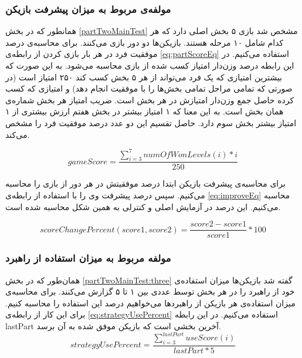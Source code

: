 \documentclass[twoside, a4paper,11pt]{book}
\numberwithin{equation}{chapter}
\numberwithin{table}{chapter}
\numberwithin{figure}{chapter}
\numberwithin{equation}{chapter}
\begin{document}
\subsubsection{مولفه‌ی مربوط به میزان پیشرفت بازیکن}

همانطور که در بخش \ref{partTwoMainTest} مشخص شد بازی ۵ بخش اصلی دارد که هر کدام شامل ۱۰ مرحله هستند. بازیکن‌ها دو دور بازی می‌کنند. برای محاسبه‌ی درصد موفقیت فرد در هر بار بازی کردن از رابطه‌ی \ref{eq:partScoreEq} استفاده می‌کنیم. در این رابطه درصد وزن‌دار امتیاز کسب شده از بازی محاسبه می‌شود. به این صورت که بیشترین امتیازی که یک فرد می‌تواند از هر ۵ بخش کسب کند ۲۵۰ امتیاز است (در صورتی که تمامی مراحل تمامی بخش‌ها را با موفقیت انجام دهد) و امتیازی که کسب کرده حاصل جمع وزن‌دار امتیازش در هر بخش است. ضریب امتیاز هر بخش شماره‌ی همان بخش است. به این معنا که ۱ امتیاز بیشتر در بخش هفتم ارزش بیشتری از ۱ امتیاز بیشتر بخش سوم دارد. حاصل تقسیم این دو عدد درصد موفقیت فرد را مشخص می‌کند.

\begin{equation}
\label{eq:partScoreEq}
	gameScore = \frac{\sum_{i=3}^{7} numOfWonLevels(i)*i }{250}
\end{equation}

برای محاسبه‌ی پیشرفت بازیکن ابتدا درصد موفقیتش در هر دور از بازی را محاسبه می‌کنیم. سپس درصد پیشرفت وی را با استفاده از رابطه‌ی \ref{eq:improveEq} محاسبه می‌کنیم. این درصد در آزمایش اصلی و کنترلی به همین شکل محاسبه شده است.

\begin{equation}
\label{eq:improveEq}
	scoreChangePercent(score1, score2) = \frac{score2 - score1}{score1}*100
\end{equation}

\subsubsection{مولفه مربوط به میزان استفاده از راهبرد}

همان‌طور که در بخش \ref{partTwoMainTest:three} گفته شد بازیکن‌ها میزان استفاده‌ی خود از راهبرد را در هر بخش توسط عددی بین ۱ تا ۵ گزارش می‌کنند. برای محاسبه‌ی میزان استفاده‌ی هر بازیکن از راهبردها می‌خواهیم درصد این استفاده را محاسبه کنیم. برای این کار از رابطه‌ی \ref{eq:strategyUsePercent} استفاده می‌کنیم. در این رابطه lastPart آخرین بخشی است که بازیکن موفق شده به آن برسد.
\begin{equation}
\label{eq:strategyUsePercent}
strategyUsePercent = \frac{\sum_{i=3}^{lastPart} useScore(i)}{lastPart*5}
\end{equation}
\end{document}
